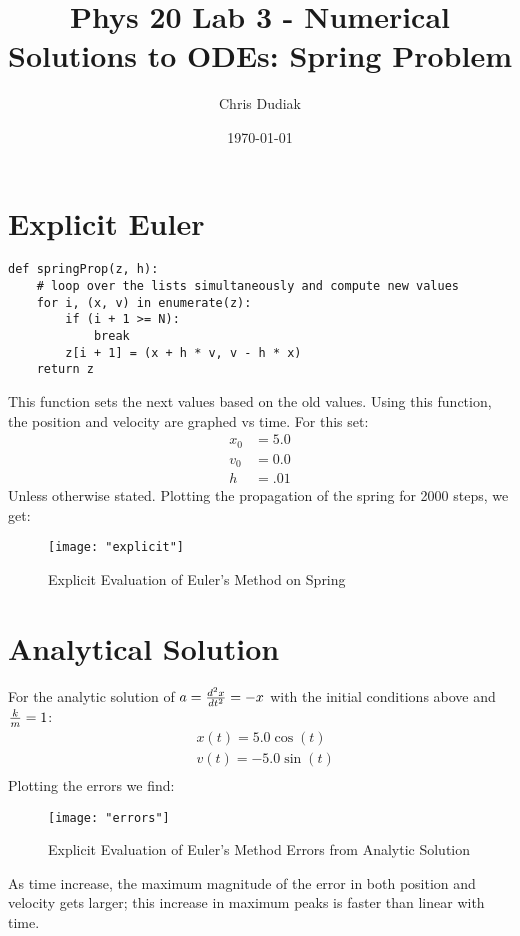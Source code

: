 \documentclass{article}
\begin{document}
\title{Phys 20 Lab 3 - Numerical Solutions to ODEs: Spring Problem}
\author{Chris Dudiak}
\date{\today}
\maketitle

\section{Explicit Euler}
\begin{verbatim}
def springProp(z, h):
    # loop over the lists simultaneously and compute new values
    for i, (x, v) in enumerate(z):
        if (i + 1 >= N):
            break
        z[i + 1] = (x + h * v, v - h * x)
    return z
\end{verbatim}
This function sets the next values based on the old values. Using this function, the position and velocity are graphed vs time. For this set:
\begin{align*}
	x_0 &= 5.0\\
	v_0 &= 0.0\\
	h &= .01
\end{align*}
Unless otherwise stated. Plotting the propagation of the spring for 2000 steps, we get:

\begin{figure}[h!]
	\centering
	\texttt{[image: "explicit"]}
	\caption{Explicit Evaluation of Euler's Method on Spring}
\end{figure} 

\FloatBarrier
\section{Analytical Solution}
For the analytic solution of $a = {d^2x \over dt^2} = -x$ with the initial conditions above and ${k\over m}  = 1$:
\begin{align*}
	&x(t) = 5.0\cos(t)\\
	&v(t) = -5.0\sin(t)\\
\end{align*}
Plotting the errors we find:
\begin{figure}[h!]
	\centering
	\texttt{[image: "errors"]}
	\caption{Explicit Evaluation of Euler's Method Errors from Analytic Solution}
\end{figure} 
\FloatBarrier
As time increase, the maximum magnitude of the error in both position and velocity gets larger; this increase in maximum peaks is faster than linear 
with time.
\end{document}
